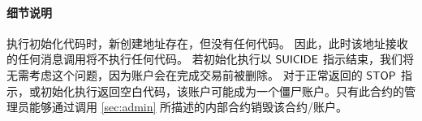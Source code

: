 \paragraph{细节说明} 
执行初始化代码时，新创建地址存在，但没有任何代码。
因此，此时该地址接收的任何消息调用将不执行任何代码。
若初始化执行以 $\mathsf{SUICIDE}$ 指示结束，我们将无需考虑这个问题，因为账户会在完成交易前被删除。
对于正常返回的 $\mathsf{STOP}$ 指示，或初始化执行返回空白代码，该账户可能成为一个僵尸账户。只有此合约的管理员能够通过调用 \cref{sec:admin} 所描述的内部合约销毁该合约/账户。
